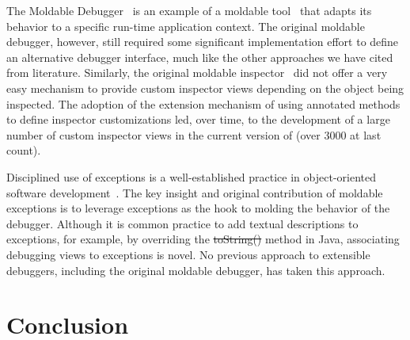 \documentclass[sigplan,screen]{acmart} %
\newcommand\on[1]{\nbc{ON}{#1}{olive}} %
\newcommand{\GT}{\lst{GT}\xspace} %
\begin{document}
The Moldable Debugger~\cite{Chis15c} is an example of a moldable tool~\cite{Chis17a} that adapts its behavior to a specific run-time application context.
The original moldable debugger, however, still required some significant implementation effort to define an alternative debugger interface, much like the other approaches we have cited from literature.
Similarly, the original moldable inspector~\cite{Chis15a} did not offer a very easy mechanism to provide custom inspector views depending on the object being inspected.
The adoption of the extension mechanism of using annotated methods to define inspector customizations led, over time, to the development of a large number of custom inspector views in the current version of \GT (over 3000 at last count).

Disciplined use of exceptions is a well-established practice in object-oriented software development~\cite{Meye88a}.
The key insight and original contribution of moldable exceptions is to leverage exceptions as the hook to molding the behavior of the debugger.
Although it is common practice to add textual descriptions to exceptions, for example, by overriding the \st{toString()} method in Java, associating debugging views to exceptions is novel.
No previous approach to extensible debuggers, including the original moldable debugger, has taken this approach.

\section{Conclusion}\label{sec:conclusion}


\end{document}
